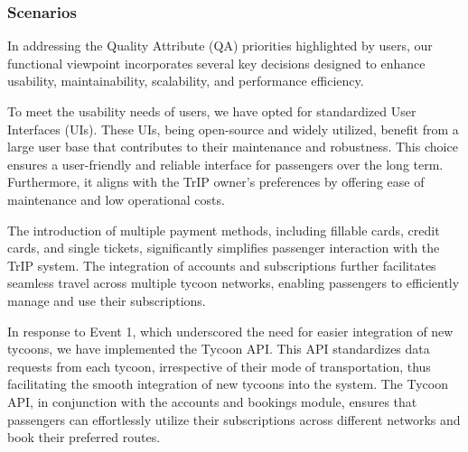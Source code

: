 \begin{table}[h!]
    \centering
    \caption{Functional View Prioritized Quality Attributes}
    \label{tab:functional_view}
\end{table}

\subsubsection{Scenarios}


In addressing the Quality Attribute (QA) priorities highlighted by users, our functional viewpoint incorporates several key decisions designed to enhance usability, maintainability, scalability, and performance efficiency.

To meet the usability needs of users, we have opted for standardized User Interfaces (UIs). These UIs, being open-source and widely utilized, benefit from a large user base that contributes to their maintenance and robustness. This choice ensures a user-friendly and reliable interface for passengers over the long term. Furthermore, it aligns with the TrIP owner's preferences by offering ease of maintenance and low operational costs.

The introduction of multiple payment methods, including fillable cards, credit cards, and single tickets, significantly simplifies passenger interaction with the TrIP system. The integration of accounts and subscriptions further facilitates seamless travel across multiple tycoon networks, enabling passengers to efficiently manage and use their subscriptions.

In response to Event 1, which underscored the need for easier integration of new tycoons, we have implemented the Tycoon API. This API standardizes data requests from each tycoon, irrespective of their mode of transportation, thus facilitating the smooth integration of new tycoons into the system. The Tycoon API, in conjunction with the accounts and bookings module, ensures that passengers can effortlessly utilize their subscriptions across different networks and book their preferred routes.

